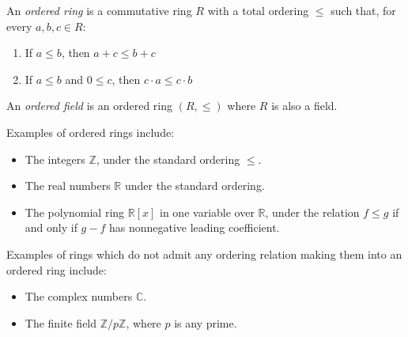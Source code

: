 \documentclass{article}
\begin{document}
An \emph{ordered ring} is a commutative ring $R$ with a total ordering $\leq$ such that, for every $a,b,c \in R$:
\begin{enumerate}
\item If $a \leq b$, then $a+c \leq b+c$
\item If $a \leq b$ and $0 \leq c$, then $c \cdot a \leq c \cdot b$
\end{enumerate}

An \emph{ordered field} is an ordered ring $(R,\leq)$ where $R$ is also a field.

Examples of ordered rings include:
\begin{itemize}
\item The integers $\mathbb{Z}$, under the standard ordering $\leq$.
\item The real numbers $\mathbb{R}$ under the standard ordering.
\item The polynomial ring $\mathbb{R}[x]$ in one variable over $\mathbb{R}$, under the relation $f \leq g$ if and only if $g-f$ has nonnegative leading coefficient.
\end{itemize}

Examples of rings which do not admit any ordering relation making them into an ordered ring include:
\begin{itemize}
\item The complex numbers $\mathbb{C}$.
\item The finite field $\mathbb{Z}/p\mathbb{Z}$, where $p$ is any prime.
\end{itemize}
\end{document}
